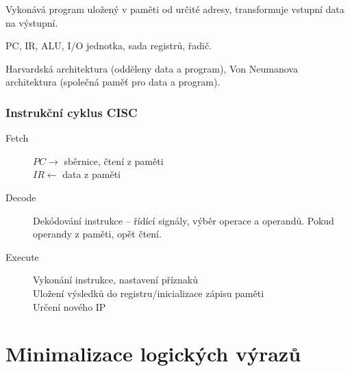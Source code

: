 \documentclass[a4paper, 11pt]{report}
\begin{document}
Vykonává program uložený v paměti od určité adresy, transformuje vstupní data na výstupní.

PC, IR, ALU, I/O jednotka, sada registrů, řadič.

Harvardská architektura (odděleny data a program), Von Neumanova architektura (společná paměť pro data a program).

\subsection{Instrukční cyklus CISC}
\begin{description}
	\item[Fetch] $PC \to $ sběrnice, čtení z paměti\\
	$IR \gets $ data z paměti
	
	\item[Decode] Dekódování instrukce -- řídící signály, výběr operace a operandů. Pokud operandy z paměti, opět čtení.
	
	\item[Execute] Vykonání instrukce, nastavení příznaků\\
	Uložení výsledků do registru/inicializace zápisu paměti\\
	Určení nového IP
\end{description}









































\chapter{Minimalizace logických výrazů} \label{cha:8}
\end{document}

